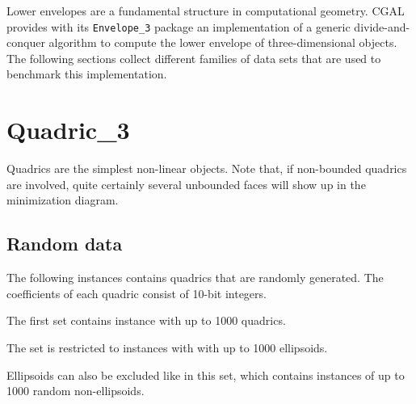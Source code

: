 
Lower envelopes are a fundamental structure in computational geometry.
CGAL provides with its {\tt Envelope\_3} package an implementation
of a generic divide-and-conquer algorithm to compute the lower envelope
of three-dimensional objects. 
The following sections collect different families of data sets that are used
to benchmark this implementation.

\section{Quadric\_3\label{bi_sec:Envelope3Quadric3}}

Quadrics are the simplest non-linear objects. 
Note that, if non-bounded quadrics
are involved, quite certainly several unbounded faces will show up in the
minimization diagram.

\subsection{Random data\label{bi_subsec:Envelope3Quadric3Randomdata}}

The following instances contains quadrics that are randomly generated. 
The coefficients of each quadric consist of 10-bit integers.

The first set contains instance with up to 1000 quadrics.

The set is restricted to instances with with up to 1000 ellipsoids.

Ellipsoids can also be excluded like in this set, which 
contains instances of up to 1000 random non-ellipsoids.


